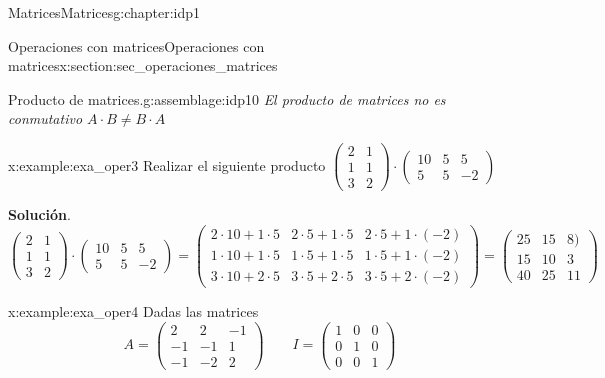 \documentclass[oneside,12pt,]{book}
\newcommand{\blocktitlefont}{\relax}
\newcommand{\amp}{&}
\begin{document}
\begin{chapterptx}{Matrices}{}{Matrices}{}{}{g:chapter:idp1}
\begin{sectionptx}{Operaciones con matrices}{}{Operaciones con matrices}{}{}{x:section:sec_operaciones_matrices}
\begin{assemblage}{Producto de matrices.}{g:assemblage:idp10}
\emph{El producto de matrices no es conmutativo \(A \cdot B \neq B\cdot A\)}%
\end{assemblage}
\begin{example}{}{x:example:exa_oper3}%
Realizar el siguiente producto \(\begin{pmatrix}
2 \amp 1 \\
1 \amp 1 \\
3 \amp 2
\end{pmatrix}
\cdot 
\begin{pmatrix}
10 \amp 5 \amp5\\
5 \amp 5 \amp-2
\end{pmatrix}\)%
\par\smallskip%
\noindent\textbf{\blocktitlefont Solución}.\hypertarget{g:solution:idp11}{}\quad{}\(\begin{pmatrix}
2 \amp 1 \\
1 \amp 1 \\
3 \amp 2
\end{pmatrix}
\cdot 
\begin{pmatrix}
10 \amp 5 \amp5\\
5 \amp 5 \amp-2
\end{pmatrix}
=
\begin{pmatrix}
2\cdot 10 + 1 \cdot 5 \amp 2\cdot 5 + 1 \cdot 5 \amp 2\cdot 5 + 1 \cdot (-2)\\
1\cdot 10 + 1 \cdot 5 \amp 1\cdot 5 + 1 \cdot 5 \amp 1\cdot 5 + 1 \cdot (-2)\\
3\cdot 10 + 2 \cdot 5 \amp 3\cdot 5 + 2 \cdot 5 \amp 3\cdot 5 + 2 \cdot (-2)
\end{pmatrix} 
= 
\begin{pmatrix}
25 \amp 15\amp 8)\\
15 \amp 10 \amp 3\\
40 \amp 25 \amp 11
\end{pmatrix}\)%
\end{example}
\begin{example}{}{x:example:exa_oper4}%
Dadas las matrices%
\begin{equation*}
A=\begin{pmatrix}
2\amp2\amp-1 \\
-1\amp-1\amp1 \\
-1\amp-2\amp2
\end{pmatrix}
\qquad
I=\begin{pmatrix}
1\amp0\amp0 \\
0\amp1\amp0 \\
0\amp0\amp1
\end{pmatrix}
\end{equation*}

\end{example}
\end{sectionptx}
\end{chapterptx}
\end{document}
